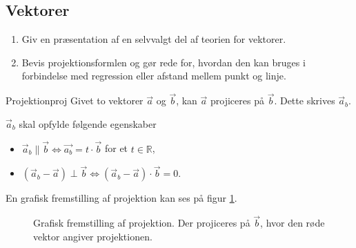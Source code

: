 \documentclass{article}
\begin{document}
\begin{tcolorbox}
    \section{Vektorer}
    \tcblower
    \begin{enumerate}
        \item Giv en præsentation af en selvvalgt del af teorien for vektorer.
        \item Bevis projektionsformlen og gør rede for, hvordan den kan bruges
            i forbindelse med regression eller afstand mellem punkt og linje.
    \end{enumerate}
\end{tcolorbox}

\begin{definition}{Projektion}{proj}
    Givet to vektorer $\vec{a}$ og $\vec{b}$, kan $\vec{a}$ projiceres på
    $\vec{b}$. Dette skrives $\vec{a}_b$.

    $\vec{a}_b$ skal opfylde følgende egenskaber
    \begin{itemize}
        \item $\vec{a}_b \parallel \vec{b} \iff \vec{a_b} = t \cdot \vec{b}$ for et $t \in \mathbb{R}$,
        \item $(\vec{a}_b - \vec{a}) \perp \vec{b} \iff (\vec{a}_b - \vec{a}) \cdot \vec{b} = 0$.
    \end{itemize}
\end{definition}
En grafisk fremstilling af projektion kan ses på figur \ref{projektion}.
\begin{figure}[hbt]
    \centering
    \caption{Grafisk fremstilling af projektion. Der projiceres på $\vec{b}$,
    hvor den røde vektor angiver projektionen.}
    \label{projektion}
\end{figure}
\end{document}
